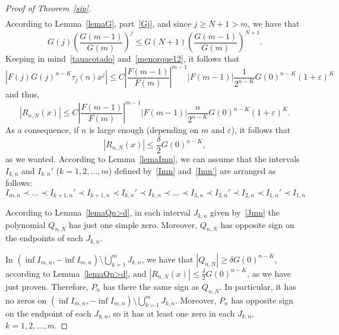 \documentclass[10pt, a4paper, leqno]{amsart}
\numberwithin{equation}{section}
\theoremstyle{plain}
\theoremstyle{remark}
\newcommand{\eps}{\varepsilon}
\begin{document}
\begin{proof}[Proof of Theorem~\ref{sip}]
\begin{multline*}
\end{multline*}
According to Lemma~\ref{lemaG}, part~\eqref{Gj}, and since $j \ge N+1 > m$, we have that
\[
  G(j)
  \left( \frac{G(m-1)}{G(m)} \right)^j
  \le G(N+1) \left( \frac{G(m-1)}{G(m)} \right)^{N+1}.
\]
Keeping in mind~\eqref{tauacotado} and~\eqref{menorque12}, it follows that
\[
  |F(j) G(j)^{n-K} \tau_j(n) x^j|
  \le C \left| \frac{F(m-1)}{F(m)} \right|^{m-1} |F(m-1)| 
  \frac{1}{2^{n-K}} G(0)^{n-K} (1+\eps)^K
\]
and thus,
\[
  |R_{n,N}(x)| \le
  C \left| \frac{F(m-1)}{F(m)} \right|^{m-1} |F(m-1)| \frac{n}{2^{n-K}} G(0)^{n-K}
  (1+\eps)^K.
\]
As a consequence, if $n$ is large enough (depending on $m$ and $\eps$), it follows that
\[
  |R_{n,N}(x)| \le \frac{\delta}{2} G(0)^{n-K},
\]
as we wanted. According to Lemma~\ref{lemaImn}, we can assume that the intervals $I_{k,n}$ and $I_{k,n}'$ ($k=1,2,\dots,m$) defined by~\eqref{Imn} and~\eqref{Imn'} are arranged as follows:
\[
  I_{m,n} \prec \dots \prec I_{k+1,n}' \prec I_{k+1,n} \prec I_{k,n}' \prec I_{k,n} 
  \prec \dots \prec I_{3,n} \prec I_{2,n}' \prec I_{2,n} \prec I_{1,n}' \prec I_{1,n}
\]

According to Lemma~\ref{lemaQn>d}, in each interval $J_{k,n}$ given by~\eqref{Jmn} the polynomial $Q_{n,N}$ has just one simple zero. Moreover, $Q_{n,N}$ has opposite sign on the endpoints of each $J_{k,n}$.

In $(\inf I_{m,n},-\inf I_{m,n}) \setminus \bigcup_{k=1}^m J_{k,n}$, we have that $|Q_{n,N}| \ge \delta G(0)^{n-K}$, according to Lemma~\ref{lemaQn>d}, and $|R_{n,N}(x)| \le \frac{\delta}{2} G(0)^{n-K}$, as we have just proven. Therefore, $P_n$ has there the same sign as $Q_{n,N}$. In particular, it has no zeros on $(\inf I_{m,n},-\inf I_{m,n}) \setminus \bigcup_{k=1}^m J_{k,n}$. Moreover, $P_n$ has opposite sign on the endpoint of each $J_{k,n}$, so it has at least one zero in each $J_{k,n}$, $k=1,2,\dots,m$.


\end{proof}
\end{document}
